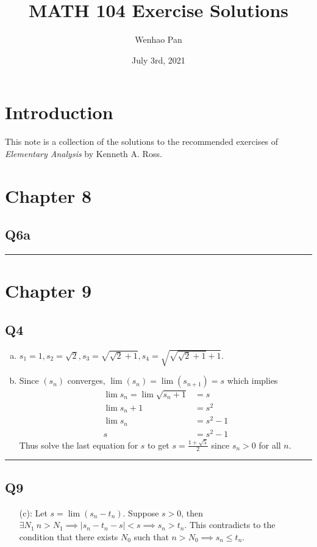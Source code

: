 \documentclass[12pt, lettersize]{article}
\title{MATH 104 Exercise Solutions}
\author{Wenhao Pan}
\date{July 3rd, 2021}
\newcommand{\lline}{\noindent\rule{\textwidth}{1pt}}
\begin{document}
	
	\maketitle
	
	\section*{Introduction}
	This note is a collection of the solutions to the recommended exercises of \textit{Elementary Analysis} by Kenneth A. Ross.	
	
	\section*{Chapter 8}
	\subsection*{Q6a}
	
	\lline
	
	\section*{Chapter 9}
	\subsection*{Q4}
	\begin{enumerate}[(a)]
		\item $s_1=1, s_2=\sqrt{2}, s_3=\sqrt{\sqrt{2}+1}, s_4=\sqrt{\sqrt{\sqrt{2}+1}+1}$.
		\item Since $(s_n)$ converges, $\lim (s_n)=\lim (s_{n+1})=s$ which implies
		\begin{align*}
			\lim s_n=\lim\sqrt{s_n+1} &= s\\
					 \lim s_n+1 &= s^2\\
					 \lim s_n &= s^2-1\\
					 s &= s^2-1
		\end{align*}
		Thus solve the last equation for $s$ to get $s=\frac{1+\sqrt{5}}{2}$ since $s_n>0$ for all $n$.
	\end{enumerate}
	
	\lline
	
	\subsection*{Q9}
	\begin{enumerate}
		\item[(c):] Let $s=\lim(s_n-t_n)$. Suppose $s>0$, then $\exists N_1\ n>N_1\implies |s_n-t_n-s|<s\implies s_n>t_n$. This contradicts to the condition that there exists $N_0$ such that $n>N_0\implies s_n\leq t_n$.  
	\end{enumerate}
	
\end{document}
